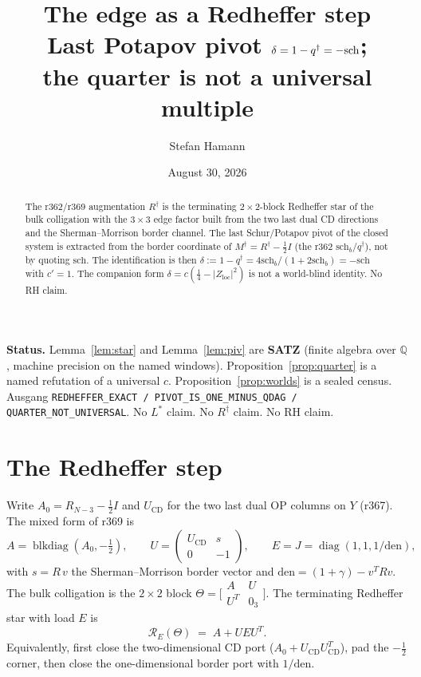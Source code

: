 \documentclass[11pt]{article}
\title{\bfseries The edge as a Redheffer step\\[2mm]
\large Last Potapov pivot $\delta=1-\qdag=-\sch$;\\
the quarter is not a universal multiple}
\author{Stefan Hamann}
\date{August 30, 2026}
\theoremstyle{remark}
\newcommand{\Rd}{R^{\dagger}}
\newcommand{\Md}{M^{\dagger}}
\newcommand{\qdag}{q^{\dagger}}
\newcommand{\sch}{\mathrm{sch}}
\newcommand{\Zloc}{Z_{\mathrm{loc}}}
\newcommand{\schb}{\mathrm{sch}_{b}}
\begin{document}
\maketitle

\begin{abstract}\noindent
The r362/r369 augmentation $\Rd$ is the terminating
$2\times 2$-block Redheffer star of the bulk colligation
with the $3\times 3$ edge factor built from the two last
dual CD directions and the Sherman--Morrison border
channel.  The last Schur/Potapov pivot of the closed
system is extracted from the border coordinate of
$\Md=\Rd-\tfrac12 I$ (the r362 $\schb$/$\qdag$), not by
quoting $\sch$.  The identification is then
$\delta:=1-\qdag=4\schb/(1+2\schb)=-\sch$
with $c'=1$.
The companion form $\delta=c(\tfrac14-\lvert\Zloc\rvert^{2})$
is not a world-blind identity.
No RH claim.
\end{abstract}

\medskip\noindent
\textbf{Status.}\enspace
Lemma~\ref{lem:star} and Lemma~\ref{lem:piv} are
\textbf{SATZ} (finite algebra over $\mathbb{Q}$,
machine precision on the named windows).
Proposition~\ref{prop:quarter} is a named refutation
of a universal $c$.
Proposition~\ref{prop:worlds} is a sealed census.
Ausgang
\texttt{REDHEFFER\_EXACT / PIVOT\_IS\_ONE\_MINUS\_QDAG / QUARTER\_NOT\_UNIVERSAL}.
No $L^{*}$ claim.  No $R^{\dagger}$ claim.  No RH claim.

\section{The Redheffer step}\label{sec:star}

Write $A_{0}=R_{N-3}-\tfrac12 I$ and $U_{\mathrm{CD}}$
for the two last dual OP columns on $Y$ (r367).
The mixed form of r369 is
\[
A=\operatorname{blkdiag}(A_{0},-\tfrac12),\qquad
U=\begin{pmatrix}U_{\mathrm{CD}} & s\\ 0 & -1\end{pmatrix},\qquad
E=J=\operatorname{diag}(1,1,1/\mathrm{den}),
\]
with $s=R\,v$ the Sherman--Morrison border vector and
$\mathrm{den}=(1+\gamma)-v^{T}Rv$.
The bulk colligation is the $2\times 2$ block
$\Theta=\bigl[\begin{smallmatrix}A & U\\ U^{T} & 0_{3}\end{smallmatrix}\bigr]$.
The terminating Redheffer star with load $E$ is
\begin{equation}\label{eq:load}
\mathcal{R}_{E}(\Theta)
\;=\;
A+UEU^{T}.
\end{equation}
Equivalently, first close the two-dimensional CD port
($A_{0}+U_{\mathrm{CD}}U_{\mathrm{CD}}^{T}$), pad the
$-\tfrac12$ corner, then close the one-dimensional
border port with $1/\mathrm{den}$.
\end{document}
